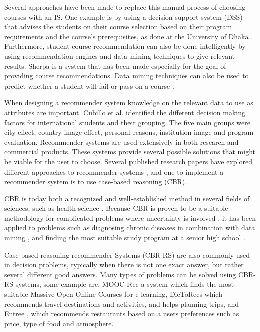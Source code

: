 Several approaches have been made to replace this manual process of choosing courses with an IS. One example is by using a decision support system (DSS) that advises the students on their course selection based on their program requirements and the course's prerequisites, as done at the University of Dhaka \cite{roushan2014university}. Furthermore, student course recommendation can also be done intelligently by using recommendation engines and data mining techniques to give relevant results. Sherpa \cite{bramucci2012sherpa} is a system that has been made especially for the goal of providing course recommendations. Data mining techniques can also be used to predict whether a student will fail or pass on a course \cite{vialardi2009recommendation}.

When designing a recommender system knowledge on the relevant data to use as attributes are important. Cubillo et al. \cite{maria2006international} identified the different decision making factors for international students and their grouping. The five main groups were city effect, country image effect, personal reasons, institution image and program evaluation. Recommender systems are used extensively in both research and commercial products. These systems provide several possible solutions that might be viable for the user to choose. Several published research papers have explored different approaches to recommender systems \cite{mulyana2015case}\cite{quijano2011happy}, and one to implement a recommender system is to use case-based reasoning (CBR). 

CBR is today both a recognized and well-established method in several fields of sciences; such as health science \cite{begum2011case}. Because CBR is proven to be a suitable methodology for complicated problems where uncertainty is involved \cite{richter2013case}, it has been applied to problems such as diagnosing chronic diseases in combination with data mining \cite{huang2007integrating}, and finding the most suitable study program at a senior high school \cite{mulyana2015case}. 

Case-based reasoning recommender Systems (CBR-RS) are also commonly used in decision problems, typically when there is not one exact answer, but rather several different good answers. Many types of problems can be solved using CBR-RS systems, some example are: MOOC-Rec \cite{bousbahi2015mooc} a system which finds the most suitable Massive Open Online Courses for e-learning, DieToRecs \cite{esenmaier2003dietorecs} which recommends travel destinations and activities, and helps planning trips, and Entree \cite{trewin2000knowledge}, which recommends restaurants based on a users preferences such as price, type of food and atmosphere. 

